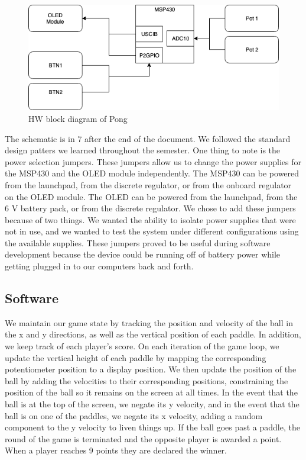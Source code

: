 \documentclass{article}
\begin{document}
\begin{figure}[h!]
    \centering
    \includegraphics[width=\textwidth]{diag.png}
    \caption{HW block diagram of Pong}
    \label{fig:my_label}
\end{figure}

The schematic is in 7 after the end of the document. We followed the standard design patters we learned throughout the semester. One thing to note is the power selection jumpers. These jumpers allow us to change the power supplies for the MSP430 and the OLED module independently. The MSP430 can be powered from the launchpad, from the discrete regulator, or from the onboard regulator on the OLED module. The OLED can be powered from the launchpad, from the 6 V battery pack, or from the discrete regulator. We chose to add these jumpers because of two things. We wanted the ability to isolate power supplies that were not in use, and we wanted to test the system under different configurations using the available supplies.
These jumpers proved to be useful during software development because the device could be running off of battery power while getting plugged in to our computers back and forth. 

\subsection{Software}
We maintain our game state by tracking the position and velocity of the ball in the x and y directions, as well as the vertical position
of each paddle. In addition, we keep track of each player's score. On each iteration of the game loop, we update the vertical
height of each paddle by mapping the corresponding potentiometer position to a display position. We then update the position of
the ball by adding the velocities
to their corresponding positions, constraining the position of the ball so it remains on the screen at all times. In the
event that the ball is at the top of the screen, we negate its y velocity, and in the event that the ball is on one of the paddles, we negate
its x velocity, adding a random component to the y velocity to liven things up. If the ball goes past a paddle,
the round of the game is terminated and the opposite player is awarded a point. When a player reaches 9 points they are declared the winner.
\end{document}
